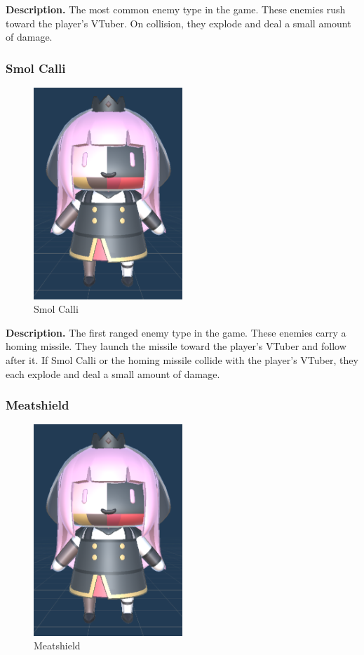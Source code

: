 \documentclass[10pt, a4paper]{article}
\begin{document}
	\textbf{Description.} The most common enemy type in the game. These enemies rush toward the player's VTuber. On collision, they explode and deal a small amount of damage.

	\goodbreak

	\subsubsection{Smol Calli}

	\begin{figure}[H]
		\centering
		\includegraphics[width=0.5\textwidth]{images/smol_calli1.png}
		\caption{Smol Calli}
		\label{fig:smolcalli}
	\end{figure}

	\textbf{Description.} The first ranged enemy type in the game. These enemies carry a homing missile. They launch the missile toward the player's VTuber and follow after it. If Smol Calli or the homing missile collide with the player's VTuber, they each explode and deal a small amount of damage.

	\subsubsection{Meatshield}

	\begin{figure}[H]
		\centering
		\includegraphics[width=0.5\textwidth]{images/smol_calli1.png}
		\caption{Meatshield}
		\label{fig:meatshield}
	\end{figure}
\end{document}
